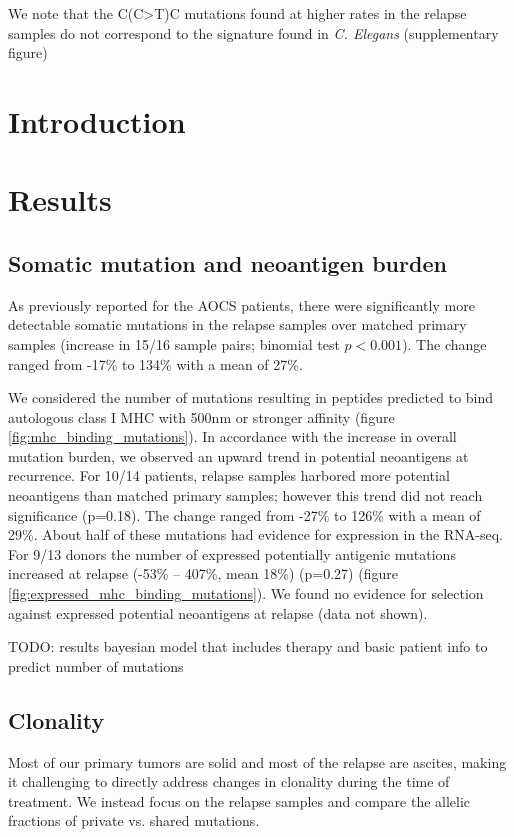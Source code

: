We note that the C(C>T)C mutations found at higher rates in the relapse samples do not correspond to the signature found in \textit{C. Elegans} (supplementary figure)


\iffalse

\section*{Introduction}




\section*{Results}
\subsection*{Somatic mutation and neoantigen burden}

As previously reported for the AOCS patients, there were significantly more detectable somatic mutations in the relapse samples over matched primary samples (increase in 15/16 sample pairs; binomial test $p \lt 0.001$). The change ranged from -17\% to 134\% with a mean of 27\%.

We considered the number of mutations resulting in peptides predicted to bind autologous class I MHC with 500nm or stronger affinity (figure \ref{fig:mhc_binding_mutations}). In accordance with the increase in overall mutation burden, we observed an upward trend in potential neoantigens at recurrence. For 10/14 patients, relapse samples harbored more potential neoantigens than matched primary samples; however this trend did not reach significance (p=0.18). The change ranged from -27\% to 126\% with a mean of 29\%. About half of these mutations had evidence for expression in the RNA-seq. For 9/13 donors the number of expressed potentially antigenic mutations increased at relapse (-53\% -- 407\%, mean 18\%) (p=0.27) (figure \ref{fig:expressed_mhc_binding_mutations}). We found no evidence for selection against expressed potential neoantigens at relapse (data not shown).

TODO: results bayesian model that includes therapy and basic patient info to predict number of mutations


\subsection*{Clonality}
Most of our primary tumors are solid and most of the relapse are ascites, making it challenging to directly address changes in clonality during the time of treatment. We instead focus on the relapse samples and compare the allelic fractions of private vs. shared mutations.


